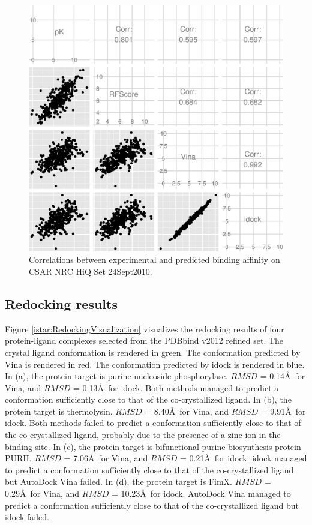 \begin{figure}
\begin{center}
\includegraphics[width=\linewidth]{../istar/CSAR2010Correlations.eps}
\end{center}
\caption{Correlations between experimental and predicted binding affinity on CSAR NRC HiQ Set 24Sept2010.}
\label{istar:CSAR2010Correlations}
\end{figure}

\subsection{Redocking results}

Figure \ref{istar:RedockingVisualization} visualizes the redocking results of four protein-ligand complexes selected from the PDBbind v2012 refined set. The crystal ligand conformation is rendered in green. The conformation predicted by Vina is rendered in red. The conformation predicted by idock is rendered in blue. In (a), the protein target is purine nucleoside phosphorylase. $RMSD$ = 0.14\AA\ for Vina, and $RMSD$ = 0.13\AA\ for idock. Both methods managed to predict a conformation sufficiently close to that of the co-crystallized ligand. In (b), the protein target is thermolysin. $RMSD$ = 8.40\AA\ for Vina, and $RMSD$ = 9.91\AA\ for idock. Both methods failed to predict a conformation sufficiently close to that of the co-crystallized ligand, probably due to the presence of a zinc ion in the binding site. In (c), the protein target is bifunctional purine biosynthesis protein PURH. $RMSD$ = 7.06\AA\ for Vina, and $RMSD$ = 0.21\AA\ for idock. idock managed to predict a conformation sufficiently close to that of the co-crystallized ligand but AutoDock Vina failed. In (d), the protein target is FimX. $RMSD$ = 0.29\AA\ for Vina, and $RMSD$ = 10.23\AA\ for idock. AutoDock Vina managed to predict a conformation sufficiently close to that of the co-crystallized ligand but idock failed.

